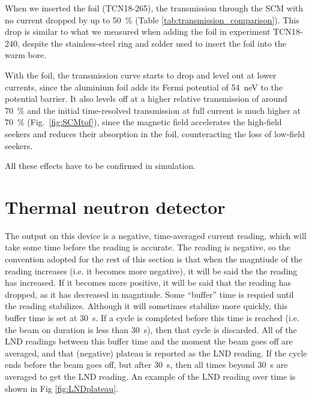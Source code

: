 \documentclass[10pt,letterpaper]{article}
\begin{document}
When we inserted the foil (TCN18-265), the transmission through the SCM with no current dropped by up to \SI{50}{\percent} (Table \ref{tab:transmission_comparison}). This drop is similar to what we measured when adding the foil in experiment TCN18-240, despite the stainless-steel ring and solder used to insert the foil into the warm bore.

With the foil, the transmission curve starts to drop and level out at lower currents, since the aluminium foil adds its Fermi potential of \SI{54}{\nano\electronvolt} to the potential barrier. It also levels off at a higher relative transmission of around \SI{70}{\percent} and the initial time-resolved transmission at full current is much higher at \SI{70}{\percent} (Fig.~\ref{fig:SCMtof}), since the magnetic field accelerates the high-field seekers and reduces their absorption in the foil, counteracting the loss of low-field seekers.

All these effects have to be confirmed in simulation.




\section{Thermal neutron detector}

The output on this device is a negative, time-averaged current reading, which will take some time before the reading is accurate. The reading is negative, so the convention adopted for the rest of this section is that when the magntiude of the reading increases (i.e. it becomes more negative), it will be said the the reading has increased. If it becomes more positive, it will be said that the reading has dropped, as it has decreased in magntiude. Some ``buffer'' time is requied until the reading stabilizes. Although it will sometimes stabilize more quickly, this buffer time is set at \SI{30}{\second}. If a cycle is completed before this time is reached (i.e. the beam on duration is less than \SI{30}{\second}), then that cycle is discarded. All of the LND readings between this buffer time and the moment the beam goes off are averaged, and that (negative) plateau is reported as the LND reading. If the cycle ends before the beam goes off, but after \SI{30}{\second}, then all times beyond \SI{30}{\second} are averaged to get the LND reading. An example of the LND reading over time is shown in Fig \ref{fig:LNDplateau}.
\end{document}

